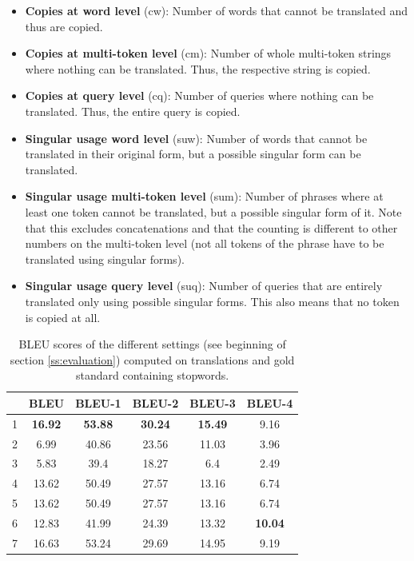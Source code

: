 \documentclass[a4paper,11pt]{article}
\begin{document}
\begin{itemize}
		\item \textbf{Copies at word level} (cw): Number of words that cannot be translated and thus are copied.
		\item \textbf{Copies at multi-token level} (cm): Number of whole multi-token strings where nothing can be translated. Thus, the respective string is copied.
		\item \textbf{Copies at query level} (cq): Number of queries where nothing can be translated. Thus, the entire query is copied.
		\item \textbf{Singular usage word level} (suw): Number of words that cannot be translated in their original form, but a possible singular form can be translated.
		\item \textbf{Singular usage multi-token level} (sum): Number of phrases where at least one token cannot be translated, but a possible singular form of it. Note that this excludes concatenations and that the counting is different to other numbers on the multi-token level (not all tokens of the phrase have to be translated using singular forms).
		\item \textbf{Singular usage query level} (suq): Number of queries that are entirely translated only using possible singular forms. This also means that no token is copied at all.
	\end{itemize}

\begin{table}[t]
	\begin{tabular}{c|c|c|c|c|c}
		&BLEU & BLEU-1 & BLEU-2 & BLEU-3 & BLEU-4\\
		\hline
	 1 & \textbf{16.92} & \textbf{53.88} & \textbf{30.24} & \textbf{15.49} & 9.16\\
	 2 & 6.99 &	40.86 &	23.56 &	11.03 &	3.96\\
	 3 & 5.83 &	39.4 & 18.27 & 6.4 & 2.49\\
	 4 & 13.62 & 50.49 & 27.57 & 13.16 & 6.74\\
	 5 & 13.62 & 50.49 & 27.57 & 13.16 & 6.74\\
	 6 & 12.83 & 41.99 & 24.39 & 13.32 & \textbf{10.04}\\
	 7 & 16.63 & 53.24 & 29.69 & 14.95 & 9.19\\
	\end{tabular}
	\caption{BLEU scores of the different settings (see beginning of section \ref{ss:evaluation}) computed on translations and gold standard containing stopwords.}
\label{tab:bleu_sw}
\end{table}
\end{document}

